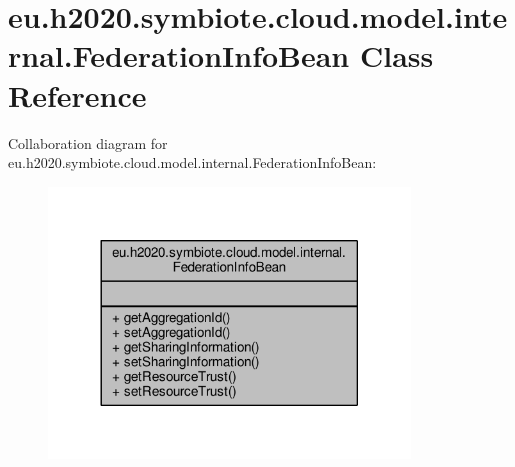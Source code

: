 \hypertarget{classeu_1_1h2020_1_1symbiote_1_1cloud_1_1model_1_1internal_1_1FederationInfoBean}{}\section{eu.\+h2020.\+symbiote.\+cloud.\+model.\+internal.\+Federation\+Info\+Bean Class Reference}
\label{classeu_1_1h2020_1_1symbiote_1_1cloud_1_1model_1_1internal_1_1FederationInfoBean}


Collaboration diagram for eu.\+h2020.\+symbiote.\+cloud.\+model.\+internal.\+Federation\+Info\+Bean\+:\nopagebreak
\begin{figure}[H]
\begin{center}
\leavevmode
\includegraphics[width=272pt]{classeu_1_1h2020_1_1symbiote_1_1cloud_1_1model_1_1internal_1_1FederationInfoBean__coll__graph}
\end{center}
\end{figure}
